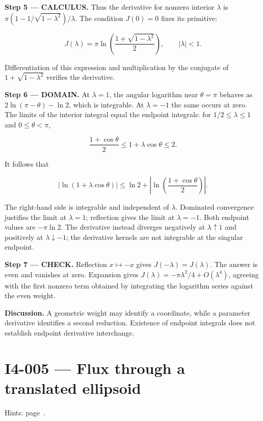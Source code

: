 \documentclass[11pt,oneside,openany]{book}
\begin{document}
\endgroup
\textbf{Step 5 --- CALCULUS.} Thus the derivative for nonzero interior \(\lambda\) is \(\pi(1-1/\sqrt{1-\lambda^2})/\lambda\). The condition \(J(0)=0\) fixes its primitive:

\[
J(\lambda)=\pi\ln\left(\frac{1+\sqrt{1-\lambda^2}}{2}\right),\qquad |\lambda|<1.
\]

Differentiation of this expression and multiplication by the conjugate of \(1+\sqrt{1-\lambda^2}\) verifies the derivative.

\begin{DomainStep}
\textbf{Step 6 --- DOMAIN.} At \(\lambda=1\), the angular logarithm near \(\theta=\pi\) behaves as \(2\ln(\pi-\theta)-\ln2\), which is integrable. At \(\lambda=-1\) the same occurs at zero. The limits of the interior integral equal the endpoint integrals: for \(1/2\le\lambda\le1\) and \(0\le\theta<\pi\),

\[
\frac{1+\cos\theta}{2}\le1+\lambda\cos\theta\le2.
\]

It follows that

\[
|\ln(1+\lambda\cos\theta)|
\le\ln2+\left|\ln\left(\frac{1+\cos\theta}{2}\right)\right|.
\]

The right-hand side is integrable and independent of \(\lambda\). Dominated convergence justifies the limit at \(\lambda=1\); reflection gives the limit at \(\lambda=-1\). Both endpoint values are \(-\pi\ln2\). The derivative instead diverges negatively at \(\lambda\uparrow1\) and positively at \(\lambda\downarrow-1\); the derivative kernels are not integrable at the singular endpoint.

\end{DomainStep}
\textbf{Step 7 --- CHECK.} Reflection \(x\mapsto-x\) gives \(J(-\lambda)=J(\lambda)\). The answer is even and vanishes at zero. Expansion gives \(J(\lambda)=-\pi\lambda^2/4+O(\lambda^4)\), agreeing with the first nonzero term obtained by integrating the logarithm series against the even weight.

\textbf{Discussion.} A geometric weight may identify a coordinate, while a parameter derivative identifies a second reduction. Existence of endpoint integrals does not establish endpoint derivative interchange.
\clearpage
\section{I4-005 --- Flux through a translated ellipsoid}
\label{problem:I4-005}
{\small Hints: page~\pageref{hints:I4-005}.}\par\medskip
\end{document}
